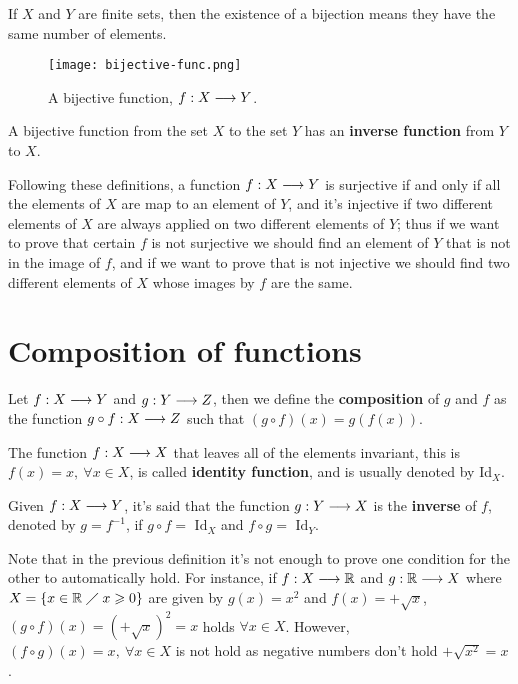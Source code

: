 \begin{remark}
    If $X$ and $Y$ are finite sets, then the existence of a bijection means they have the same number of elements.
\end{remark}

\begin{figure}[htbp]
    \centerline{\texttt{[image: bijective-func.png]}}
    \caption{A bijective function, $f : X\longrightarrow Y$.}
\end{figure}

A bijective function from the set $X$ to the set $Y$ has an \textbf{inverse function} from $Y$ to $X$.

Following these definitions, a function $f : X\longrightarrow Y$ is surjective if and only if all the elements of $X$ are map to an element of $Y$, and it's injective if two different elements of $X$ are always applied on two different elements of $Y$; thus if we want to prove that certain $f$ is not surjective we should find an element of $Y$ that is not in the image of $f$, and if we want to prove that is not injective we should find two different elements of $X$ whose images by $f$ are the same.

\section{Composition of functions}
\begin{defi}
    Let $f : X\longrightarrow Y$ and $g : Y\longrightarrow Z$, then we define the \textbf{composition} of $g$ and $f$ as the function $g\circ f : X\longrightarrow Z$ such that $\left( g\circ f \right) \left( x \right) = g\left( f\left( x \right)  \right) $.
\end{defi}

\begin{defi}
    The function $f : X\longrightarrow X$ that leaves all of the elements invariant, this is $f\left( x \right) = x,\ \forall x\in X$, is called \textbf{identity function}, and is usually denoted by Id$_X$.
\end{defi}

\begin{defi}
    Given $f : X\longrightarrow Y$, it's said that the function $g : Y\longrightarrow X$ is the \textbf{inverse} of $f$, denoted by $g = f^{-1}$, if $g\circ f = \textrm{ Id}_X$ and $f\circ g = \textrm{ Id}_Y$.
\end{defi}

Note that in the previous definition it's not enough to prove one condition for the other to automatically hold. For instance, if $f : X\longrightarrow \mathbb{R}$ and $g : \mathbb{R}\longrightarrow X$ where $X = \{x\in\mathbb{R}\;\diagup\; x \geqslant 0\} $ are given by $g\left( x \right) = x^2$ and $f\left( x \right) = +\sqrt{x}$, $\left( g\circ f \right) \left( x \right) = \left( +\sqrt{x}  \right)^2 = x$ holds $\forall x\in X$. However, $\left( f\circ g \right)\left( x \right) = x,\ \forall x\in X$ is not hold as negative numbers don't hold $+\sqrt{x^2} = x $.


